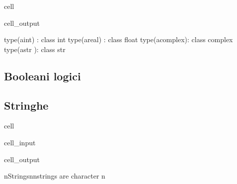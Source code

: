 \documentclass[letterpaper,10pt,english]{jupyterBook}
\begin{document}
\begin{sphinxuseclass}{cell}
\begin{sphinxVerbatimOutput}
\begin{sphinxuseclass}{cell_output}
\begin{sphinxVerbatim}[commandchars=\\\{\}]
type(a\PYGZus{}int)    : \PYGZlt{}class \PYGZsq{}int\PYGZsq{}\PYGZgt{}
type(a\PYGZus{}real)   : \PYGZlt{}class \PYGZsq{}float\PYGZsq{}\PYGZgt{}
type(a\PYGZus{}complex): \PYGZlt{}class \PYGZsq{}complex\PYGZsq{}\PYGZgt{}
type(a\PYGZus{}str    ): \PYGZlt{}class \PYGZsq{}str\PYGZsq{}\PYGZgt{}
\end{sphinxVerbatim}

\end{sphinxuseclass}\end{sphinxVerbatimOutput}

\end{sphinxuseclass}

\subsection{Booleani \sphinxhyphen{} logici}
\label{\detokenize{ch/programming/types:booleani-logici}}

\subsection{Stringhe}
\label{\detokenize{ch/programming/types:stringhe}}
\begin{sphinxuseclass}{cell}\begin{sphinxVerbatimInput}

\begin{sphinxuseclass}{cell_input}
\begin{sphinxVerbatim}[commandchars=\\\{\}]

\end{sphinxVerbatim}

\end{sphinxuseclass}\end{sphinxVerbatimInput}
\begin{sphinxVerbatimOutput}

\begin{sphinxuseclass}{cell_output}
\begin{sphinxVerbatim}[commandchars=\\\{\}]
\PYGZsq{}\PYGZbs{}nStrings\PYGZbs{}n\PYGZbs{}nstrings are character \PYGZbs{}n\PYGZsq{}
\end{sphinxVerbatim}

\end{sphinxuseclass}\end{sphinxVerbatimOutput}

\end{sphinxuseclass}
\end{document}

